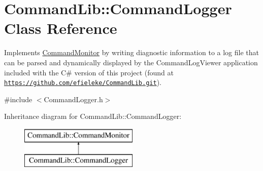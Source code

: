 \hypertarget{class_command_lib_1_1_command_logger}{}\section{Command\+Lib\+:\+:Command\+Logger Class Reference}
\label{class_command_lib_1_1_command_logger}


Implements \mbox{\hyperlink{class_command_lib_1_1_command_monitor}{Command\+Monitor}} by writing diagnostic information to a log file that can be parsed and dynamically displayed by the Command\+Log\+Viewer application included with the C\# version of this project (found at \href{https://github.com/efieleke/CommandLib.git}{\tt https\+://github.\+com/efieleke/\+Command\+Lib.\+git}).  




{\ttfamily \#include $<$Command\+Logger.\+h$>$}

Inheritance diagram for Command\+Lib\+:\+:Command\+Logger\+:\begin{figure}[H]
\begin{center}
\leavevmode
\includegraphics[height=2.000000cm]{class_command_lib_1_1_command_logger}
\end{center}
\end{figure}

